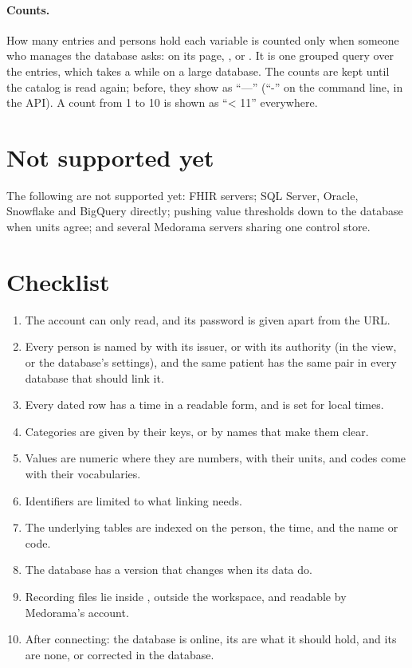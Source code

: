 \paragraph{Counts.} How many entries and persons hold each variable is counted only when someone
who manages the database asks:  on its page, ,
or . It is one grouped query over the entries, which
takes a while on a large database. The counts are kept until the catalog is read again; before,
they show as ``---'' (``-'' on the command line,  in the API). A count from 1 to 10 is
shown as ``< 11'' everywhere.

\section{Not supported yet}
\label{sec:connecting-not-yet}

The following are not supported yet: FHIR servers; SQL Server, Oracle, Snowflake and BigQuery
directly; pushing value thresholds down to the
database when units agree; and several Medorama servers sharing one control store.

\section{Checklist}
\label{sec:connecting-checklist}

\begin{enumerate}
\item The account can only read, and its password is given apart from the URL.
\item Every person is named by  with its issuer, or  with its
  authority (in the view, or the database's settings), and the same patient has the same pair in
  every database that should link it.
\item Every dated row has a time in a readable form, and  is set for local times.
\item Categories are given by their keys, or by names that make them clear.
\item Values are numeric where they are numbers, with their units, and codes come with their
  vocabularies.
\item Identifiers are limited to what linking needs.
\item The underlying tables are indexed on the person, the time, and the name or code.
\item The database has a version that changes when its data do.
\item Recording files lie inside , outside the workspace, and readable by
  Medorama's account.
\item After connecting: the database is online, its  are what it should hold, and
  its  are none, or corrected in the database.
\end{enumerate}
